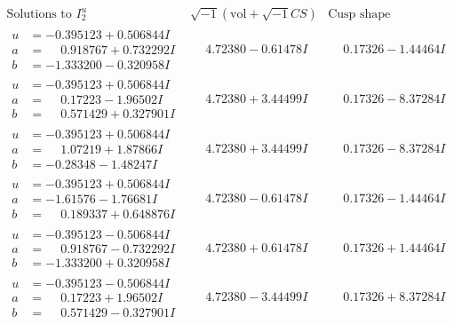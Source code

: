 \documentclass[1p]{elsarticle_modified}
\theoremstyle{definition}
\newcommand{\I}{\sqrt{-1}}
\begin{document}
$$\begin{array}{c|c|c}  
\text{Solutions to }I^u_{2}& \I (\text{vol} + \sqrt{-1}CS) & \text{Cusp shape}\\
 \hline 
\begin{aligned}
u &= -0.395123 + 0.506844 I \\
a &= \phantom{-}0.918767 + 0.732292 I \\
b &= -1.333200 - 0.320958 I\end{aligned}
 & \phantom{-}4.72380 - 0.61478 I & \phantom{-}0.17326 - 1.44464 I \\ \hline\begin{aligned}
u &= -0.395123 + 0.506844 I \\
a &= \phantom{-}0.17223 - 1.96502 I \\
b &= \phantom{-}0.571429 + 0.327901 I\end{aligned}
 & \phantom{-}4.72380 + 3.44499 I & \phantom{-}0.17326 - 8.37284 I \\ \hline\begin{aligned}
u &= -0.395123 + 0.506844 I \\
a &= \phantom{-}1.07219 + 1.87866 I \\
b &= -0.28348 - 1.48247 I\end{aligned}
 & \phantom{-}4.72380 + 3.44499 I & \phantom{-}0.17326 - 8.37284 I \\ \hline\begin{aligned}
u &= -0.395123 + 0.506844 I \\
a &= -1.61576 - 1.76681 I \\
b &= \phantom{-}0.189337 + 0.648876 I\end{aligned}
 & \phantom{-}4.72380 - 0.61478 I & \phantom{-}0.17326 - 1.44464 I \\ \hline\begin{aligned}
u &= -0.395123 - 0.506844 I \\
a &= \phantom{-}0.918767 - 0.732292 I \\
b &= -1.333200 + 0.320958 I\end{aligned}
 & \phantom{-}4.72380 + 0.61478 I & \phantom{-}0.17326 + 1.44464 I \\ \hline\begin{aligned}
u &= -0.395123 - 0.506844 I \\
a &= \phantom{-}0.17223 + 1.96502 I \\
b &= \phantom{-}0.571429 - 0.327901 I\end{aligned}
 & \phantom{-}4.72380 - 3.44499 I & \phantom{-}0.17326 + 8.37284 I \\ \hline\begin{aligned}

\end{aligned}
\end{array}$$
\end{document}
